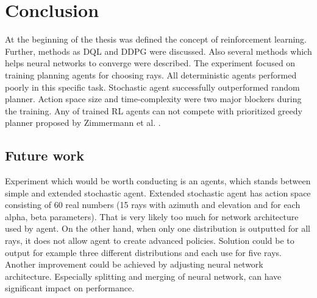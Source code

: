 \section{Conclusion}
At the beginning of the thesis was defined the concept of reinforcement learning. Further, methods as DQL and DDPG were discussed. Also several methods which helps neural networks to converge were described. The experiment focused on training planning agents for choosing rays. All deterministic agents performed poorly in this specific task. Stochastic agent successfully outperformed random planner. Action space size and time-complexity were two major blockers during the training. Any of trained RL agents can not compete with prioritized greedy planner proposed by Zimmermann et al. \cite{zimmermann2017}.


\subsection{Future work}
Experiment which would be worth conducting is an agents, which stands between simple and extended stochastic agent. Extended stochastic agent has action space consisting of 60 real numbers (15 rays with azimuth and elevation and for each alpha, beta parameters). That is very likely too much for network architecture used by agent. On the other hand, when only one distribution is outputted for all rays, it does not allow agent to create advanced policies. Solution could be to output for example three different distributions and each use for five rays. Another improvement could be achieved by adjusting neural network architecture. Especially splitting and merging of neural network, can have significant impact on performance. 
